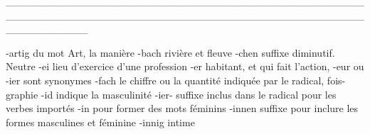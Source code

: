 ___________________________________________________________________________________________________________

-artig       du mot Art, la manière
-bach        rivière et fleuve
-chen        suffixe diminutif. Neutre
-ei          lieu d'exercice d'une profession
-er          habitant, et qui fait l'action, -eur ou -ier sont synonymes
-fach        le chiffre ou la quantité indiquée par le radical, fois-graphie
-id          indique la masculinité
-ier-        suffixe inclus dans le radical pour les verbes importés
-in          pour former des mots féminins
-innen       suffixe pour inclure les formes masculines et féminine
-innig       intime
